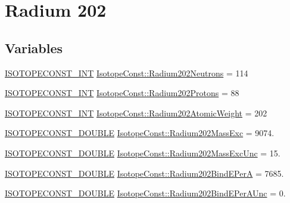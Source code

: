 \hypertarget{group___isotope_const-_radium-_ra202}{}\section{Radium 202}
\label{group___isotope_const-_radium-_ra202}
\subsection*{Variables}
\begin{DoxyCompactItemize}
\item 
\mbox{\hyperlink{group___isotope_const-_macros_ga5f18360b3e99483a35c32d789e62621c}{I\+S\+O\+T\+O\+P\+E\+C\+O\+N\+S\+T\+\_\+\+I\+NT}} \mbox{\hyperlink{group___isotope_const-_radium-_ra202_ga26db4c64d562d5efdec74f8dc721a9d3}{Isotope\+Const\+::\+Radium202\+Neutrons}} = 114
\item 
\mbox{\hyperlink{group___isotope_const-_macros_ga5f18360b3e99483a35c32d789e62621c}{I\+S\+O\+T\+O\+P\+E\+C\+O\+N\+S\+T\+\_\+\+I\+NT}} \mbox{\hyperlink{group___isotope_const-_radium-_ra202_ga9f5362a70878cc0925d09ef0d7ac607b}{Isotope\+Const\+::\+Radium202\+Protons}} = 88
\item 
\mbox{\hyperlink{group___isotope_const-_macros_ga5f18360b3e99483a35c32d789e62621c}{I\+S\+O\+T\+O\+P\+E\+C\+O\+N\+S\+T\+\_\+\+I\+NT}} \mbox{\hyperlink{group___isotope_const-_radium-_ra202_ga2779785e96349d9e5590a6fb02bbcdce}{Isotope\+Const\+::\+Radium202\+Atomic\+Weight}} = 202
\item 
\mbox{\hyperlink{group___isotope_const-_macros_ga8f45a7272ce02c0b4c65c44636ed719a}{I\+S\+O\+T\+O\+P\+E\+C\+O\+N\+S\+T\+\_\+\+D\+O\+U\+B\+LE}} \mbox{\hyperlink{group___isotope_const-_radium-_ra202_ga7d8cd450b9315aab87d7acba9160d040}{Isotope\+Const\+::\+Radium202\+Mass\+Exc}} = 9074.
\item 
\mbox{\hyperlink{group___isotope_const-_macros_ga8f45a7272ce02c0b4c65c44636ed719a}{I\+S\+O\+T\+O\+P\+E\+C\+O\+N\+S\+T\+\_\+\+D\+O\+U\+B\+LE}} \mbox{\hyperlink{group___isotope_const-_radium-_ra202_ga08b24dc176ec17d79632e6b125161b31}{Isotope\+Const\+::\+Radium202\+Mass\+Exc\+Unc}} = 15.
\item 
\mbox{\hyperlink{group___isotope_const-_macros_ga8f45a7272ce02c0b4c65c44636ed719a}{I\+S\+O\+T\+O\+P\+E\+C\+O\+N\+S\+T\+\_\+\+D\+O\+U\+B\+LE}} \mbox{\hyperlink{group___isotope_const-_radium-_ra202_ga916ae0f690ed16f2ca8720a6d5c7f6fa}{Isotope\+Const\+::\+Radium202\+Bind\+E\+PerA}} = 7685.
\item 
\mbox{\hyperlink{group___isotope_const-_macros_ga8f45a7272ce02c0b4c65c44636ed719a}{I\+S\+O\+T\+O\+P\+E\+C\+O\+N\+S\+T\+\_\+\+D\+O\+U\+B\+LE}} \mbox{\hyperlink{group___isotope_const-_radium-_ra202_ga80e050a1d9f234504dc1e3c64dbc4ecb}{Isotope\+Const\+::\+Radium202\+Bind\+E\+Per\+A\+Unc}} = 0.

\end{DoxyCompactItemize}
